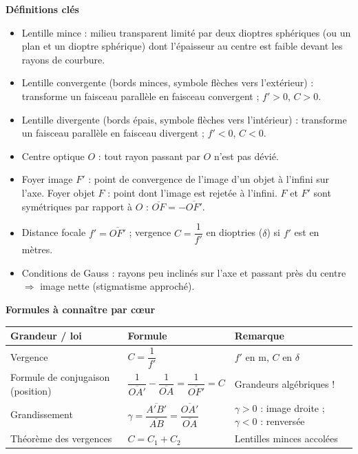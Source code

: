 \documentclass[11pt]{article}
\newcommand{\cle}[1]{{\popxbold\color{popdark}#1}}
\begin{document}
\begin{bilan}
\textbf{Définitions clés}
\begin{itemize}
  \item \cle{Lentille mince} : milieu transparent limité par deux dioptres sphériques (ou un plan et un dioptre sphérique) dont l'épaisseur au centre est faible devant les rayons de courbure.
  \item \cle{Lentille convergente} (bords minces, symbole flèches vers l'extérieur) : transforme un faisceau parallèle en faisceau convergent ; $f'>0$, $C>0$.
  \item \cle{Lentille divergente} (bords épais, symbole flèches vers l'intérieur) : transforme un faisceau parallèle en faisceau divergent ; $f'<0$, $C<0$.
  \item \cle{Centre optique} $O$ : tout rayon passant par $O$ n'est pas dévié.
  \item \cle{Foyer image} $F'$ : point de convergence de l'image d'un objet à l'infini sur l'axe. \cle{Foyer objet} $F$ : point dont l'image est rejetée à l'infini. $F$ et $F'$ sont symétriques par rapport à $O$ : $\overline{OF}=-\overline{OF'}$.
  \item \cle{Distance focale} $f'=\overline{OF'}$ ; \cle{vergence} $C=\dfrac{1}{f'}$ en dioptries ($\delta$) si $f'$ est en mètres.
  \item \cle{Conditions de Gauss} : rayons peu inclinés sur l'axe et passant près du centre $\Rightarrow$ image nette (stigmatisme approché).
\end{itemize}

\textbf{Formules à connaître par cœur}
\begin{center}
\begin{tabularx}{\linewidth}{|l|X|l|}
\hline
\rowcolor{popblueL} \textbf{Grandeur / loi} & \textbf{Formule} & \textbf{Remarque} \\
\hline
Vergence & $C=\dfrac{1}{f'}$ & $f'$ en m, $C$ en $\delta$ \\
\hline
Formule de conjugaison (position) & $\dfrac{1}{\overline{OA'}}-\dfrac{1}{\overline{OA}}=\dfrac{1}{\overline{OF'}}=C$ & Grandeurs algébriques ! \\
\hline
Grandissement & $\gamma=\dfrac{\overline{A'B'}}{\overline{AB}}=\dfrac{\overline{OA'}}{\overline{OA}}$ & $\gamma>0$ : image droite ; $\gamma<0$ : renversée \\
\hline
Théorème des vergences & $C=C_1+C_2$ & Lentilles minces accolées \\
\hline
\end{tabularx}
\end{center}


\end{bilan}
\end{document}
